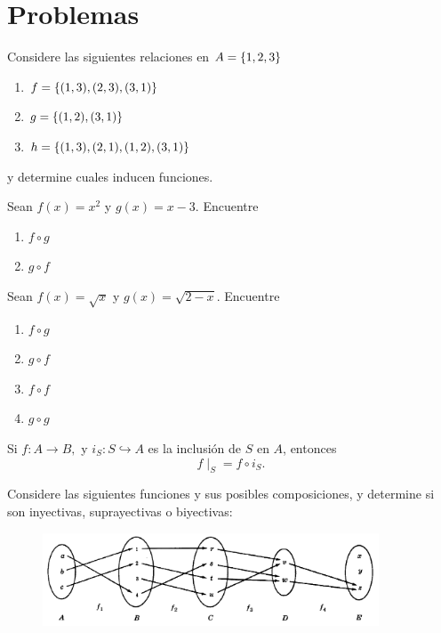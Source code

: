 \section*{Problemas}

\begin{problema}
	Considere las siguientes relaciones en $A=\left\{ 1,2,3 \right\}$
	\begin{enumerate}
		\item $f=\left\{ (1,3),(2,3),(3,1) \right\}$
		\item $g=\left\{ (1,2), (3,1) \right\}$
		\item $h=\left\{ (1,3),(2,1),(1,2),(3,1) \right\}$
	\end{enumerate}
	y determine cuales inducen funciones.
\end{problema}



\begin{problema}
	Sean $f(x)=x^{2}$ y $g(x)=x-3.$ Encuentre 
	\begin{enumerate}
		\item $f\circ g$ 
		\item $g\circ f$
	\end{enumerate}
\end{problema}




\begin{problema}
	Sean $f(x)=\sqrt{x}$ y $g(x)=\sqrt{2-x}.$ Encuentre 
	\begin{enumerate}
		\item $f\circ g$ 
		\item $g\circ f$ 
		\item $f\circ f$ 
		\item $g\circ g$
	\end{enumerate}
	
\end{problema}


 
 \begin{problema}
  Si $f:A \to B,$ y $i_{S}:S\hookrightarrow A$ es la inclusión de $S$ en $A$, entonces
  $$
  f\mid_{S}= f\circ i_{S}.
  $$
 \end{problema}
 



\begin{problema}
	Considere las siguientes funciones y sus posibles composiciones, y determine si son inyectivas, suprayectivas o biyectivas:
	
	\begin{figure}
		\centering
		\includegraphics[width=10cm,keepaspectratio=true]{./md/MD02_IM01.png}
		\label{fig:MD0201}
	\end{figure}
	
\end{problema}

